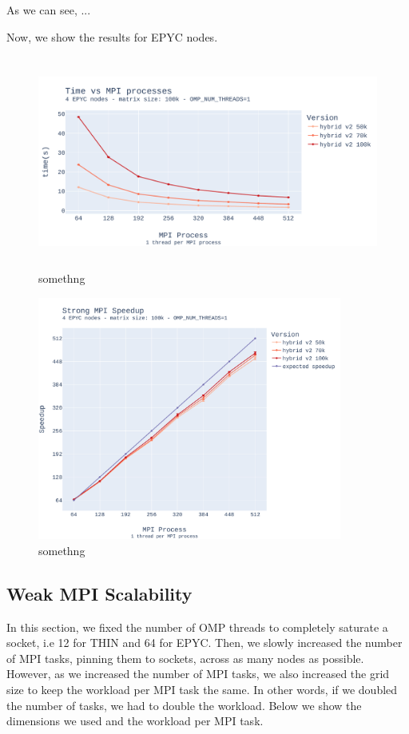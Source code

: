 \documentclass{report}
\begin{document}
As we can see, ... 

Now, we show the results for EPYC nodes.

\begin{figure}[H]
\centering
\includegraphics[width=14cm, height=7cm]{./images/strong_MPI_epyc_hybrid_grid_100k.pdf}
\caption{\label{fig:strongmpiepychybrid} somethng}
\end{figure}

\begin{figure}[H]
\centering
\includegraphics[width=10cm, height=8cm]{./images/strong_MPI_epyc_hybrid_grid_100k_speedup.pdf}
\caption{\label{fig:strongmpiepychybridspeedup} somethng}
\end{figure}

\subsection{Weak MPI Scalability}

In this section, we fixed the number of OMP threads to completely saturate a 
socket, i.e 12 for THIN and 64 for EPYC. Then, we slowly increased the number 
of MPI tasks, pinning them to sockets, across as many nodes as possible. However, 
as we increased the number of MPI tasks, we also increased the grid size to 
keep the workload per MPI task the same. In other words, if we doubled the number 
of tasks, we had to double the workload. Below we show the dimensions we used and 
the workload per MPI task.
\end{document}
